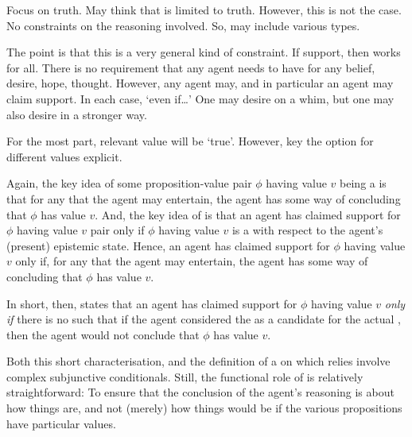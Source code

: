 \begin{note}
  Focus on truth.
  May think that \support{} is limited to truth.
  However, this is not the case.
  No constraints on the reasoning involved.
  So, may include various types.

  The point is that this is a very general kind of constraint.
  If support, then works for all.
  There is no requirement that any agent needs to have \support{} for any belief, desire, hope, thought.
  However, any agent may, and in particular an agent may claim support.
  In each case, `even if\dots'
  One may desire on a whim, but one may also desire in a stronger way.

  For the most part, relevant value will be `true'.
  However, key the option for different values explicit.
\end{note}

\begin{note}
  Again, the key idea of some proposition-value pair \(\phi\) having value \(v\) being a \sink{} is that for any \epPAd{} \world{} that the agent may entertain, the agent has some way of concluding that \(\phi\) has value \(v\).
  And, the key idea of \ideaCSA{} is that an agent has claimed support for \(\phi\) having value \(v\) pair only if \(\phi\) having value \(v\) is a \sink{} with respect to the agent's (present) epistemic state.
  Hence, an agent has claimed support for \(\phi\) having value \(v\) only if, for any \epPAd{} \world{} that the agent may entertain, the agent has some way of concluding that \(\phi\) has value \(v\).

  In short, then, \ideaCSA{} states that an agent has claimed support for \(\phi\) having value \(v\) \emph{only if} there is no \epPAd{} \world{} such that if the agent considered the \epPAd{} \world{} as a candidate for the actual \world{}, then the agent would not conclude that \(\phi\) has value \(v\).

  Both this short characterisation, and the definition of a \sink{} on which \ideaCSA{} relies involve complex subjunctive conditionals.
  Still, the functional role of \ideaCSA{} is relatively straightforward:
  To ensure that the conclusion of the agent's reasoning is about how things are, and not (merely) how things would be if the various propositions have particular values.
\end{note}

